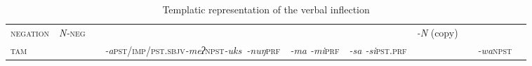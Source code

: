 \begin{table}
{\begin{tabularx}{1.33\textwidth}{XXXXXXXXXX}
	\scshape negation & \emph{N-}\newline \textsc{neg} & & & & & \emph{-N} (copy) & & & \\
	\scshape tam & & & \emph{-a}\newline \textsc{pst/\newline imp/\newline pst.sbjv}\newline \emph{-meʔ}\newline \textsc{npst}\newline \mbox{\emph{-uks \ti -nuŋ}}\newline \textsc{prf} & \emph{-ma \ti\newline -mi}\newline \textsc{prf} & \emph{-sa \ti -si}\newline \textsc{pst.prf} & & & \emph{-wa}\newline \textsc{npst} &   \\
\midrule
\end{tabularx}
}
\bigskip
{}

\caption{Templatic representation of the verbal inflection}\label{xyz}
\end{table}

